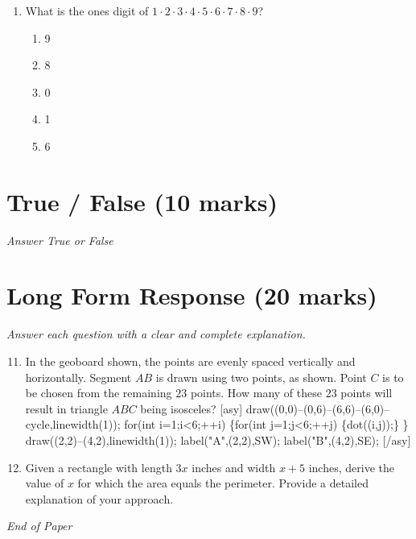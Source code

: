 \documentclass[12pt]{article}
\begin{document}
\begin{enumerate}[label=\arabic*.]
\begin{enumerate}[label=(\alph*)]
    \item 40320
    \item 7257600
\end{enumerate}
\item What is the ones digit of $1 \cdot 2 \cdot 3 \cdot 4 \cdot 5 \cdot 6 \cdot 7 \cdot 8 \cdot 9$?
\begin{enumerate}[label=(\alph*)]
    \item 9
    \item 8
    \item 0
    \item 1
    \item 6
\end{enumerate}
\end{enumerate}

\section*{True / False (10 marks)}
\textit{Answer True or False}

\section*{Long Form Response (20 marks)}
\textit{Answer each question with a clear and complete explanation.}
\begin{enumerate}[label=\arabic*.]
\setcounter{enumi}{10}
\item In the geoboard shown, the points are evenly spaced vertically and horizontally. Segment $AB$ is drawn using two points, as shown. Point $C$ is to be chosen from the remaining $23$ points. How many of these $23$ points will result in triangle $ABC$ being isosceles? [asy] draw((0,0)--(0,6)--(6,6)--(6,0)--cycle,linewidth(1)); for(int i=1;i\textless{}6;++i) \{for(int j=1;j\textless{}6;++j) \{dot((i,j));\} \} draw((2,2)--(4,2),linewidth(1)); label("A",(2,2),SW); label("B",(4,2),SE); [/asy]
\item Given a rectangle with length \(3 x\) inches and width \(x + 5\) inches, derive the value of \(x\) for which the area equals the perimeter. Provide a detailed explanation of your approach.
\end{enumerate}

\vfill
\noindent\textit{End of Paper}
\end{document}
